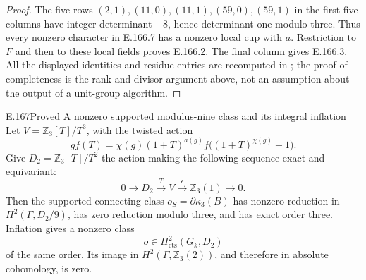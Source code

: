 \begin{proof}
The five rows \((2,1),(11,0),(11,1),(59,0),(59,1)\) in the
first five columns have integer determinant \(-8\), hence determinant
one modulo three.  Thus every nonzero character in E.166.7 has a
nonzero local cup with \(a\).  Restriction to \(F\) and then to
these local fields proves E.166.2.  The final column gives E.166.3.
All the displayed identities and residue entries are recomputed in
; the proof of completeness is
the rank and divisor argument above, not an assumption about the
output of a unit-group algorithm.
\end{proof}

\begin{result}{E.167}{Proved}
{A nonzero supported modulus-nine class and its integral inflation}
Let \(V=\mathbb Z_3[T]/T^3\), with the twisted action
\[
 g f(T)=\chi(g)(1+T)^{a(g)}
                  f\bigl((1+T)^{\chi(g)}-1\bigr).
\tag{E.167.1}
\]
Give \(D_2=\mathbb Z_3[T]/T^2\) the action making the following sequence
exact and equivariant:
\[
 0\longrightarrow D_2\xrightarrow{\ T\ }V
       \xrightarrow{\epsilon}\mathbb Z_3(1)\longrightarrow0.
\tag{E.167.2}
\]
Then the supported connecting class
\(o_S=\partial\kappa_3(B)\) has nonzero reduction in
\(H^2(\Gamma,D_2/9)\), has zero reduction modulo three, and has
exact order three.  Inflation gives a nonzero class
\[
 o\in H^2_{\mathrm{cts}}(G_k,D_2)
\tag{E.167.3}
\]
of the same order.  Its image in
\(H^2(\Gamma,\mathbb Z_3(2))\), and therefore in absolute cohomology,
is zero.
\end{result}

